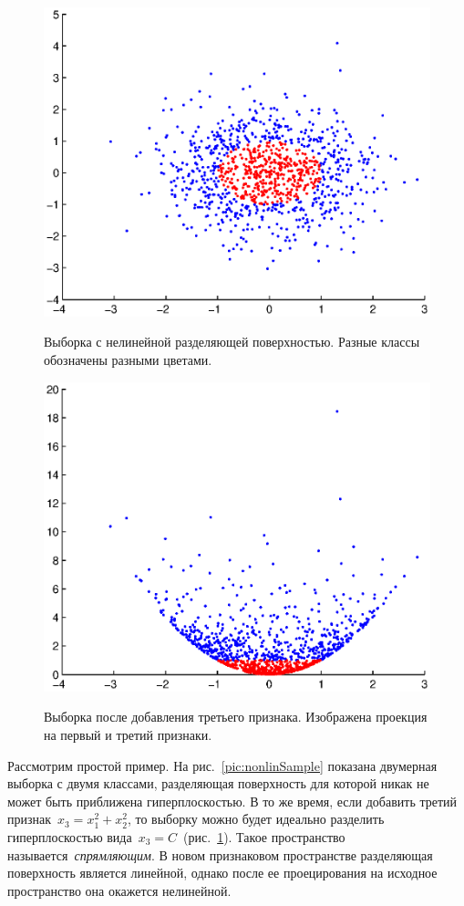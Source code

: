 \documentclass[12pt,fleqn]{article}
\begin{document}
\begin{figure}[t]
\centering
\begin{multicols}{2}
    \hfill
    \includegraphics[width=0.9\linewidth]{example.eps}
    \hfill
    \caption{Выборка с нелинейной разделяющей поверхностью.
        Разные классы обозначены разными цветами.}
    \label{pic:nonlinSample}
    \hfill
    \includegraphics[width=0.9\linewidth]{example_newFeature.eps}
    \hfill
    \caption{Выборка после добавления третьего признака.
        Изображена проекция на первый и третий признаки.}
    \label{pic:nonlinSample_ext}
\end{multicols}
\end{figure}

Рассмотрим простой пример.
На рис.~\ref{pic:nonlinSample} показана двумерная выборка с двумя классами,
разделяющая поверхность для которой никак не может быть приближена гиперплоскостью.
В то же время, если добавить третий признак~$x_3 = x_1^2 + x_2^2$,
то выборку можно будет идеально разделить гиперплоскостью
вида~$x_3 = C$~(рис.~\ref{pic:nonlinSample_ext}).
Такое пространство называется~\emph{спрямляющим}.
В новом признаковом пространстве разделяющая поверхность является
линейной, однако после ее проецирования на исходное пространство
она окажется нелинейной.
\end{document}
